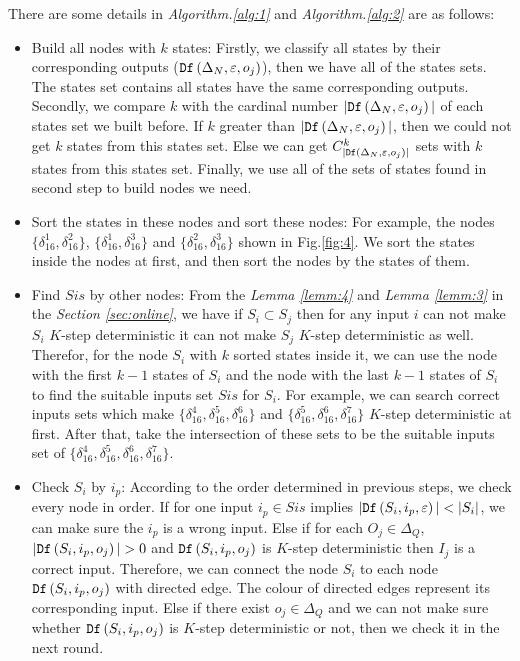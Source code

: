 There are some details in {\em Algorithm.\ref{alg:1}} and {\em Algorithm.\ref{alg:2}} are as follows:
\begin{itemize}
\item Build all nodes with $k$ states: Firstly, we classify all states by their corresponding outputs (${\tt Df}\left(\Delta_N,\varepsilon,o_j\right)$), then we have all of the states sets. The states set contains all states have the same corresponding outputs. Secondly, we compare $k$ with the cardinal number $|{\tt Df}\left(\Delta_N,\varepsilon,o_j\right)|$ of each states set we built before. If $k$ greater than $|{\tt Df}\left(\Delta_N,\varepsilon,o_j\right)|$, then we could not get $k$ states from this states set. Else we can get $C_{|{\tt Df}\left(\Delta_N,\varepsilon,o_j\right)|}^k$ sets with $k$ states from this states set. Finally, we use all of the sets of states found in second step to build nodes we need. 
 \item Sort the states in these nodes and sort these nodes: For example, the nodes $\{\delta_{16}^1,\delta_{16}^2\}$, $\{\delta_{16}^1,\delta_{16}^3\}$ and $\{\delta_{16}^2,\delta_{16}^3\}$ shown in Fig.\ref{fig:4}. We sort the states inside the nodes at first, and then sort the nodes by the states of them.
  \item Find $Sis$ by other nodes: From the {\em Lemma \ref{lemm:4}} and {\em Lemma \ref{lemm:3}} in the {\em Section \ref{sec:online}}, we have if $S_i\subset S_j$ then for any input $i$ can not make $S_i$ $K$-step deterministic it can not make $S_j$ $K$-step deterministic as well. Therefor, for the node $S_i$ with $k$ sorted states inside it, we can use the node with the first $k-1$ states of $S_i$ and the node with the last $k-1$ states of $S_i$ to find the suitable inputs set $Sis$ for $S_i$. For example, we can search correct inputs sets which make $\{\delta_{16}^4,\delta_{16}^5,\delta_{16}^6\}$ and $\{\delta_{16}^5,\delta_{16}^6,\delta_{16}^7\}$ $K$-step deterministic at first. After that, take the intersection of these sets to be the suitable inputs set of $\{\delta_{16}^4,\delta_{16}^5,\delta_{16}^6,\delta_{16}^7\}$. 
  \item Check $S_i$ by $i_p$: According to the order determined in previous steps, we check every node in order. If for one input $i_p\in Sis$ implies $|\Ded\left(S_i,i_p,\varepsilon\right)|<|S_i|$, we can make sure the $i_p$ is a wrong input. Else if for each $O_j \in \Delta_Q$, $|\Ded\left(S_i,i_p,o_j\right)|>0$ and ${\tt Df}\left(S_i,i_p,o_j\right)$ is $K$-step deterministic then $I_j$ is a correct input. Therefore, we can connect the node $S_i$ to each node ${\tt Df}\left(S_i,i_p,o_j\right)$ with directed edge. The colour of directed edges represent its corresponding input. Else if there exist $o_j \in \Delta_Q$ and we can not make sure whether ${\tt Df}\left(S_i,i_p,o_j\right)$ is $K$-step deterministic or not, then we check it in the next round. 
\end{itemize} 

